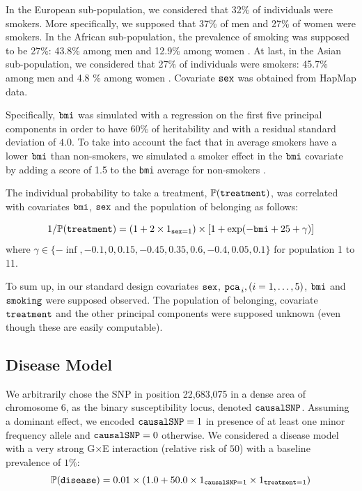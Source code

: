 \documentclass[10pt,a4paper]{article}
\begin{document}
In the European sub-population, we considered that 32\% of individuals were smokers. More specifically, we supposed that 37\% of men and 27\% of women were smokers. In the African sub-population, the prevalence of smoking was supposed to be 27\%: 43.8\% among men and 12.9\% among women \citep{christopoulou2011role}. At last, in the Asian sub-population, we considered that 27\% of individuals were smokers: 45.7\% among men and 4.8 \% among women \citep{tsai2008gender}. Covariate ${\tt sex}$ was obtained from HapMap data.

Specifically,  ${\tt bmi}$ was simulated with a regression on the first five principal components in order to have 60\% of heritability and with a residual standard deviation of $4.0$. To take into account the fact that in average smokers have a lower ${\tt bmi}$ than non-smokers, we simulated a smoker effect in the ${\tt bmi}$ covariate by adding a score of 1.5 to the {\tt bmi} average for non-smokers \citep{chiolero2008consequences}.
 
The individual probability to take a treatment, $\mathbb{P}({\tt treatment})$, was correlated with covariates ${\tt bmi}$, ${\tt sex}$ and the population of belonging as follows: 

$$1/\mathbb{P}({\tt treatment}) = (1+2 \times 1_{{\tt sex}=1})\times [1+\exp({-{\tt bmi}+25+ \gamma})]$$
where $\gamma \in \{-\inf,-0.1,0,0.15,-0.45,0.35,0.6,-0.4,0.05,0.1\}$ for population 1 to 11.

\vspace{0.3cm}
To sum up, in our standard design covariates ${\tt sex}$, ${\tt pca}_{\,i}, (i=1,\ldots,5)$, ${\tt bmi}$ and ${\tt smoking}$ were supposed observed. The population of belonging,  covariate ${\tt treatment}$ and the other principal components were supposed unknown (even though these are easily computable).


\subsection{Disease Model}

We arbitrarily chose the SNP in position 22,683,075 in a dense area of chromosome 6, as the binary susceptibility locus, denoted ${\tt causalSNP}$. Assuming a dominant effect, we encoded ${\tt causalSNP} = 1$ in presence of at least one minor frequency allele and ${\tt causalSNP} = 0$ otherwise. We considered a disease model with a very strong G$\times$E interaction (relative risk of $50$) with a baseline prevalence of $1\%$:
$$
\mathbb{P}({\tt disease})=0.01 \times (1.0 + 50.0 \times 1_{{\tt causalSNP}=1} \times 1_{{\tt treatment}=1})
$$
\end{document}
